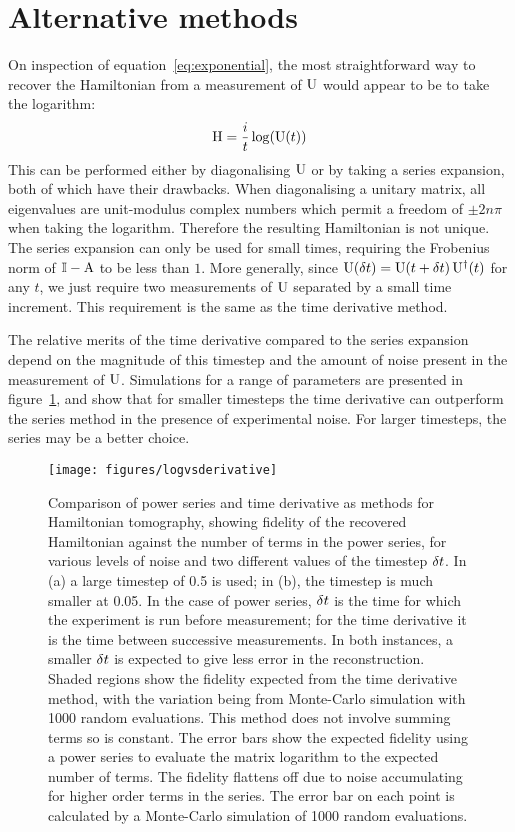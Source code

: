 \section{Alternative methods}
\label{sec:Alternatives}
On inspection of equation~\ref{eq:exponential}, the most straightforward way to
recover the Hamiltonian from a measurement of \(\mathrm{U}\) would appear to be to
take the logarithm:
\begin{equation}
  \mathrm{H} = \frac{i}{t} \log \!\left(\mathrm{U} \!\left(t\right)\right)
\end{equation}
This can be performed either by diagonalising \(\mathrm{U}\) or by taking a series
expansion, both of which have their drawbacks. When diagonalising a unitary
matrix, all eigenvalues are unit-modulus complex numbers which permit a freedom
of \(\pm 2 n \pi\) when taking the logarithm. Therefore the resulting
Hamiltonian is not unique. The series expansion can only be used for small
times, requiring the Frobenius norm of \(\mathbb{I}-\mathrm{A}\) to be less than
\(1\). More generally, since \(\mathrm{U} \!\left(\delta t\right) = \mathrm{U} \!\left(t+\delta t\right)
\mathrm{U}^{\dagger} \!\left(t\right)\) for any \(t\), we just require two measurements of
\(\mathrm{U}\) separated by a small time increment. This requirement is the same as
the time derivative method.

The relative merits of the time derivative compared to the series expansion
depend on the magnitude of this timestep and the amount of noise present in the
measurement of \(\mathrm{U}\). Simulations for a range of parameters are presented
in figure~\ref{fig:logvsderivative}, and show that for smaller timesteps the
time derivative can outperform the series method in the presence of experimental
noise. For larger timesteps, the series may be a better choice.

\begin{figure}[h]
  \texttt{[image: figures/logvsderivative]}
  \caption[Comparison of power series and time derivative methods for
  Hamiltonian recovery]
  {Comparison of power series and time derivative as methods for Hamiltonian
  tomography, showing fidelity of the recovered Hamiltonian against the number
  of terms in the power series, for various levels of noise and two different
  values of the timestep \(\delta t\). In (a) a large timestep of 0.5 is used; in
  (b), the timestep is much smaller at 0.05. In the case of power series,
  \(\delta t\) is the time for which the experiment is run before measurement; for
  the time derivative it is the time between successive measurements. In both
  instances, a smaller \(\delta t\) is expected to give less error in the
  reconstruction. Shaded regions show
  the fidelity expected from the time derivative method, with the variation
  being from Monte-Carlo simulation with 1000 random evaluations. This method
  does not involve summing terms so is constant. The error bars show the
  expected fidelity using a power series to evaluate the matrix logarithm to the
  expected number of terms. The fidelity flattens off due to noise accumulating
  for higher order terms in the series. The error bar on each point is
  calculated by a Monte-Carlo simulation of 1000 random evaluations.}
  \label{fig:logvsderivative}
\end{figure}

